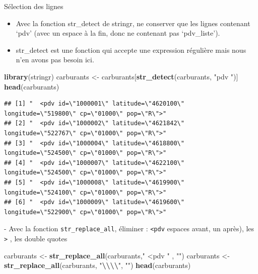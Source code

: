 \documentclass[
  ignorenonframetext,
]{beamer}
\newenvironment{Shaded}{\begin{snugshade}}{\end{snugshade}}
\newcommand{\FunctionTok}[1]{\textcolor[rgb]{0.13,0.29,0.53}{\textbf{#1}}}
\newcommand{\NormalTok}[1]{#1}
\newcommand{\OtherTok}[1]{\textcolor[rgb]{0.56,0.35,0.01}{#1}}
\newcommand{\SpecialCharTok}[1]{\textcolor[rgb]{0.81,0.36,0.00}{\textbf{#1}}}
\newcommand{\StringTok}[1]{\textcolor[rgb]{0.31,0.60,0.02}{#1}}
\providecommand{\tightlist}{%
  \setlength{\itemsep}{0pt}\setlength{\parskip}{0pt}}
\begin{document}
\begin{frame}[fragile]{Sélection des lignes}
\protect\hypertarget{suxe9lection-des-lignes}{}
\begin{itemize}
\tightlist
\item
  Avec la fonction str\_detect de stringr, ne conserver que les lignes
  contenant `pdv' (avec un espace à la fin, donc ne contenant pas
  `pdv\_liste').
\item
  str\_detect est une fonction qui accepte une expression régulière mais
  nous n'en avons pas besoin ici.
\end{itemize}

\tiny

\begin{Shaded}
\begin{Highlighting}[]
\FunctionTok{library}\NormalTok{(stringr)}
\NormalTok{carburants }\OtherTok{\textless{}{-}}\NormalTok{ carburants[}\FunctionTok{str\_detect}\NormalTok{(carburants, }\StringTok{"pdv "}\NormalTok{)]}
\FunctionTok{head}\NormalTok{(carburants)}
\end{Highlighting}
\end{Shaded}

\begin{verbatim}
## [1] "  <pdv id=\"1000001\" latitude=\"4620100\" longitude=\"519800\" cp=\"01000\" pop=\"R\">"
## [2] "  <pdv id=\"1000002\" latitude=\"4621842\" longitude=\"522767\" cp=\"01000\" pop=\"R\">"
## [3] "  <pdv id=\"1000004\" latitude=\"4618800\" longitude=\"524500\" cp=\"01000\" pop=\"R\">"
## [4] "  <pdv id=\"1000007\" latitude=\"4622100\" longitude=\"524500\" cp=\"01000\" pop=\"R\">"
## [5] "  <pdv id=\"1000008\" latitude=\"4619900\" longitude=\"524100\" cp=\"01000\" pop=\"R\">"
## [6] "  <pdv id=\"1000009\" latitude=\"4619600\" longitude=\"522900\" cp=\"01000\" pop=\"R\">"
\end{verbatim}

\normalsize - Avec la fonction \texttt{str\_replace\_all}, éliminer :
\texttt{\textless{}pdv} espaces avant, un après), les
\texttt{\textgreater{}} , les double quotes

\tiny

\begin{Shaded}
\begin{Highlighting}[]
\NormalTok{carburants }\OtherTok{\textless{}{-}} \FunctionTok{str\_replace\_all}\NormalTok{(carburants,}\StringTok{"  \textless{}pdv "}\NormalTok{ , }\StringTok{""}\NormalTok{)}
\NormalTok{carburants }\OtherTok{\textless{}{-}} \FunctionTok{str\_replace\_all}\NormalTok{(carburants, }\StringTok{"}\SpecialCharTok{\textbackslash{}\textbackslash{}\textbackslash{}\textbackslash{}}\StringTok{"}\NormalTok{, }\StringTok{""}\NormalTok{)}
\FunctionTok{head}\NormalTok{(carburants)}
\end{Highlighting}
\end{Shaded}


\end{frame}
\end{document}
